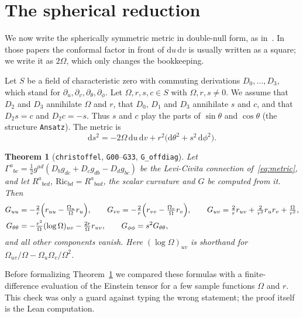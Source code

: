 \documentclass[pdflatex,sn-mathphys-num]{sn-jnl}%
\theoremstyle{thmstyleone}%
\newtheorem{theorem}{Theorem}%
\theoremstyle{thmstyletwo}%
\theoremstyle{thmstylethree}%
\newcommand{\lean}[1]{\texttt{#1}}
\newcommand{\dd}{\mathrm{d}}
\begin{document}
\section{The spherical reduction}\label{sec:reduction}

We now write the spherically symmetric metric in double-null form, as in~\cite{Christodoulou1986,Dafermos2005}. In those papers the conformal factor in front of $\dd u\,\dd v$ is usually written as a square; we write it as $2\Omega$, which only changes the bookkeeping.

Let $S$ be a field of characteristic zero with commuting derivations $D_0,\dots,D_3$, which stand for $\partial_u,\partial_v,\partial_\theta,\partial_\phi$. Let $\Omega,r,s,c\in S$ with $\Omega,r,s\ne0$. We assume that $D_2$ and $D_3$ annihilate $\Omega$ and $r$, that $D_0$, $D_1$ and $D_3$ annihilate $s$ and $c$, and that $D_2s=c$ and $D_2c=-s$. Thus $s$ and $c$ play the parts of $\sin\theta$ and $\cos\theta$ (the structure \lean{Ansatz}). The metric is
\begin{equation}\label{eq:metric}
\dd s^2=-2\Omega\,\dd u\,\dd v+r^2\bigl(\dd\theta^2+s^2\,\dd\phi^2\bigr).
\end{equation}

\begin{theorem}[\lean{christoffel}, \lean{G00}--\lean{G33}, \lean{G\_offdiag}]\label{thm:G}
Let $\Gamma^a{}_{bc}=\tfrac12g^{ad}(D_bg_{dc}+D_cg_{db}-D_dg_{bc})$ be the Levi-Civita connection of~\eqref{eq:metric}, and let $R^a{}_{bcd}$, $\mathrm{Ric}_{bd}=R^a{}_{bad}$, the scalar curvature and $G$ be computed from it. Then
\begin{align*}
G_{uu}&=-\tfrac{2}{r}\Bigl(r_{uu}-\tfrac{\Omega_u}{\Omega}r_u\Bigr),\qquad
G_{vv}=-\tfrac{2}{r}\Bigl(r_{vv}-\tfrac{\Omega_v}{\Omega}r_v\Bigr),\qquad
G_{uv}=\tfrac{2}{r}r_{uv}+\tfrac{2}{r^2}r_ur_v+\tfrac{\Omega}{r^2},\\
G_{\theta\theta}&=-\tfrac{r^2}{\Omega}(\log\Omega)_{uv}-\tfrac{2r}{\Omega}r_{uv},\qquad
G_{\phi\phi}=s^2G_{\theta\theta},
\end{align*}
and all other components vanish. Here $(\log\Omega)_{uv}$ is shorthand for $\Omega_{uv}/\Omega-\Omega_u\Omega_v/\Omega^2$.
\end{theorem}

Before formalizing Theorem~\ref{thm:G} we compared these formulas with a finite-difference evaluation of the Einstein tensor for a few sample functions $\Omega$ and $r$. This check was only a guard against typing the wrong statement; the proof itself is the Lean computation.
\end{document}
